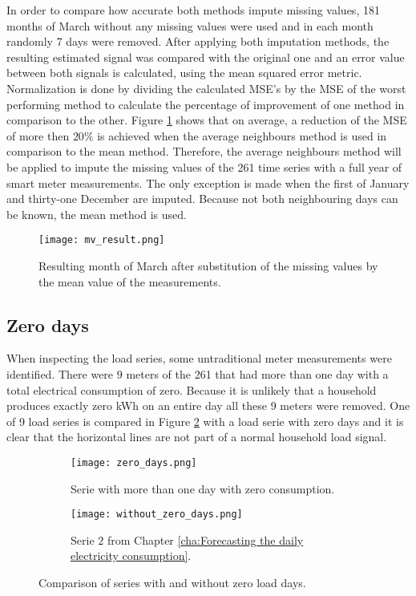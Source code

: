 In order to compare how accurate both methods impute missing values, 181 months of March without any missing values were used and in each month randomly 7 days were removed. After applying both imputation methods, the resulting estimated signal was compared with the original one and an error value between both signals is calculated, using the mean squared error metric. Normalization is done by dividing the calculated MSE's by the MSE of the worst performing method to calculate the percentage of improvement of one method in comparison to the other. Figure \ref{fig:mv_result} shows that on average, a reduction of the MSE of more then $ 20\% $ is achieved when the average neighbours method is used in comparison to the mean method. Therefore, the average neighbours method will be applied to impute the missing values of the 261 time series with a full year of smart meter measurements. The only exception is made when the first of January and thirty-one December are imputed. Because not both neighbouring days can be known, the mean method is used.

\begin{figure}[h!]
	\centering
	\texttt{[image: mv\_result.png]}
	\caption{Resulting month of March after substitution of the missing values by the mean value of the measurements. }
	\label{fig:mv_result}
\end{figure}



\subsection{Zero days}

When inspecting the load series, some untraditional meter measurements were identified. There were $ 9 $ meters of the 261 that had more than one day with a total electrical consumption of zero. Because it is unlikely that a household produces exactly zero kWh on an entire day all these $ 9 $ meters were removed. One of 9 load series is compared in Figure \ref{fig:zero_con} with a load serie with zero days and it is clear that the horizontal lines are not part of a normal household load signal.

\begin{figure}[ht]
	\begin{subfigure}{0.49\textwidth}
		\vspace{4mm}
		\texttt{[image: zero\_days.png]}
		\caption{Serie with more than one day with zero consumption.}
	\end{subfigure}	 	
	\begin{subfigure}{0.49\textwidth}
		\texttt{[image: without\_zero\_days.png]}
		\caption{Serie $ 2 $ from Chapter \ref{cha:Forecasting the daily electricity consumption}.}
	\end{subfigure}	
	\caption{Comparison of series with and without zero load days.}
	\label{fig:zero_con}
\end{figure}

